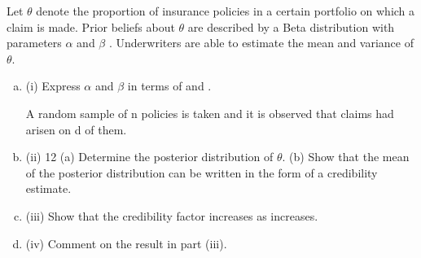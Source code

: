 \documentclass[a4paper,12pt]{article}
\begin{document}
Let $\theta$ denote the proportion of insurance policies in a certain portfolio on which a
claim is made. Prior beliefs about $\theta$ are described by a Beta distribution with
parameters $\alpha$ and $\beta$ .
Underwriters are able to estimate the mean \mu and variance  of $\theta$.

\begin{enumerate}[(a)]
\item (i)
Express $\alpha$ and $\beta$   in terms of \mu and \sigma.

A random sample of n policies is taken and it is observed that claims had arisen on d
of them.
\item (ii)
12
(a) Determine the posterior distribution of $\theta$.
(b) Show that the mean of the posterior distribution can be written in the
form of a credibility estimate.

\item (iii) Show that the credibility factor increases as \sigma increases.
\item (iv) Comment on the result in part (iii).
\end{enumerate}
\end{document}
